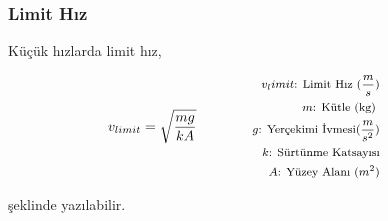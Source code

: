 \subsubsection*{Limit Hız}

Küçük hızlarda limit hız,

\begin{equation}
    v_{limit} = \sqrt{\frac{mg}{kA}} \qquad \qquad \parbox{4cm}{\footnotesize$\begin{aligned}
        v_limit\text{: Limit Hız } (\frac{m}{s}) \\
        m\text{: Kütle (kg) } \\
        g\text{: Yerçekimi İvmesi} (\frac{m}{s^2}) \\
        k\text{: Sürtünme Katsayısı} \\ 
        A\text{: Yüzey Alanı } (m^2)
\end{aligned}$}
\end{equation}

şeklinde yazılabilir.


